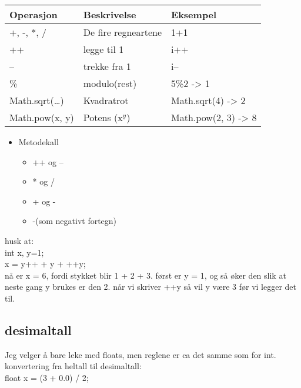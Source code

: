 \documentclass[11pt]{article}
\begin{document}
\begin{center}
\begin{tabular}{lll}
\hline
 Operasjon            &  Beskrivelse          &  Eksempel             \\
\hline
 +, -, *, /           &  De fire regneartene  &  1+1                  \\
\hline
 ++                   &  legge til 1          &  i++                  \\
\hline
 --                   &  trekke fra 1         &  i--                  \\
\hline
 \%                   &  modulo(rest)         &  5\%2 -> 1            \\
\hline
 Math.sqrt(\ldots{})  &  Kvadratrot           &  Math.sqrt(4) -> 2    \\
\hline
 Math.pow(x, y)       &  Potens (x$^y$)       &  Math.pow(2, 3) -> 8  \\
\hline
\end{tabular}
\end{center}


  
   
\begin{itemize}
\item Metodekall

\begin{itemize}
\item ++ og --
\item * og /
\item + og -
\item -(som negativt fortegn)
\end{itemize}

\end{itemize}


   husk at:\\
   int x, y=1;\\
   x = y++ + y + ++y;\\
   nå er x = 6, fordi stykket blir 1 + 2 + 3. først er y = 1, og 
   så øker den slik at neste gang y brukes er den 2. 
   når vi skriver ++y så vil y være 3 før vi legger det til.
\subsection{desimaltall}
\label{sec-1_2}


   Jeg velger å bare leke med floats, men reglene er ca det samme som for int.\\

   konvertering fra heltall til desimaltall:\\
   float x = (3 + 0.0) / 2;\\
\end{document}
